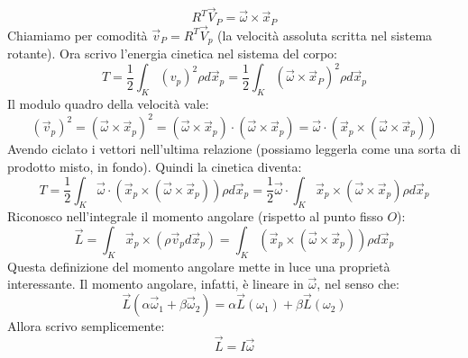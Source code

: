 \documentclass[a4paper,openany]{article}
\begin{document}
	\begin{equation}
		R^{T}\vec{V}_{P} = \vec{\omega}\times\vec{x}_{P}
		\label{TrasfVelo}
	\end{equation}
	Chiamiamo per comodità $\vec{v}_{P} = R^{T}\vec{V}_{p}$ (la velocità assoluta scritta nel sistema rotante). Ora scrivo l'energia cinetica nel sistema del corpo:
	$$
	T = \dfrac{1}{2}\int_{K}(v_{p})^{2}\rho d\vec{x}_{p} = \dfrac{1}{2}\int_{K}(\vec{\omega}\times\vec{x}_{P})^{2}\rho  d\vec{x}_{p}
	$$
	Il modulo quadro della velocità vale:
	$$
	(\vec{v}_{p})^{2} = (\vec{\omega}\times\vec{x}_{p})^2 = (\vec{\omega}\times\vec{x}_{p})\cdot(\vec{\omega}\times\vec{x}_{p}) = \vec{\omega}\cdot(\vec{x}_{p}\times(\vec{\omega}\times\vec{x}_{p}))
	$$
	Avendo ciclato i vettori nell'ultima relazione (possiamo leggerla come una sorta di prodotto misto, in fondo). Quindi la cinetica diventa:
	\begin{equation}
		T = \dfrac{1}{2}\int_{K}\vec{\omega}\cdot(\vec{x}_{p}\times(\vec{\omega}\times\vec{x}_{p}))\rho  d\vec{x}_{p} = \dfrac{1}{2}\vec{\omega}\cdot\int_{K}\vec{x}_{p}\times(\vec{\omega}\times\vec{x}_{p})\rho  d\vec{x}_{p}
	\end{equation}
	Riconosco nell'integrale il momento angolare (rispetto al punto fisso $O$):
	\begin{equation}
		\vec{L} = \int_{K} \vec{x}_{p}\times(\rho \vec{v}_{p} d\vec{x}_{p}) =  \int_{K}(\vec{x}_{p}\times(\vec{\omega}\times\vec{x}_{p}))\rho  d\vec{x}_{p}
		\label{MomAng}
	\end{equation}
	Questa definizione del momento angolare mette in luce una proprietà interessante. Il momento angolare, infatti, è lineare in $\vec{\omega}$, nel senso che:
	$$
	\vec{L}(\alpha\vec{\omega}_{1} + \beta\vec{\omega}_{2}) = \alpha \vec{L}(\omega_1) + \beta \vec{L}(\omega_2)
	$$
	Allora scrivo semplicemente:
	\begin{equation}
		\vec{L} = I\vec{\omega}
		\label{TrasfLin}
	\end{equation}
\end{document}
